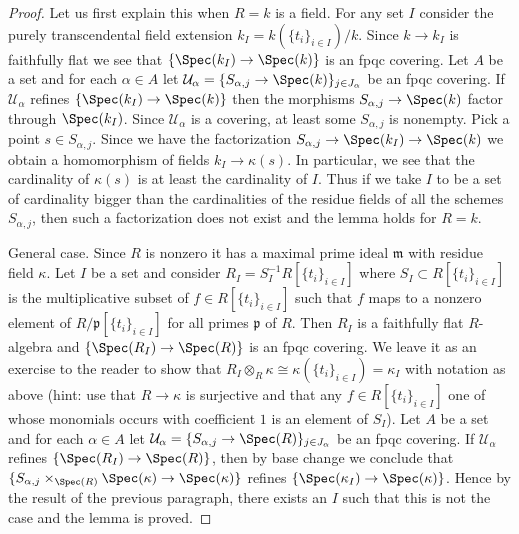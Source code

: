 \begin{proof}
Let us first explain this when $R = k$ is a field. For any set $I$ consider
the purely transcendental field extension
$k_I = k(\{t_i\}_{i \in I})/k$. Since $k \to k_I$ is faithfully flat
we see that $\{\Spec(k_I) \to \Spec(k)\}$ is an fpqc covering.
Let $A$ be a set and for each $\alpha \in A$ let
$\mathcal{U}_\alpha = \{S_{\alpha, j} \to \Spec(k)\}_{j \in J_\alpha}$ be an
fpqc covering. If $\mathcal{U}_\alpha$ refines $\{\Spec(k_I) \to \Spec(k)\}$
then the morphisms $S_{\alpha, j} \to \Spec(k)$ factor through
$\Spec(k_I)$. Since $\mathcal{U}_\alpha$ is a covering,
at least some $S_{\alpha, j}$ is nonempty. Pick a
point $s \in S_{\alpha, j}$. Since we have the factorization
$S_{\alpha, j} \to \Spec(k_I) \to \Spec(k)$
we obtain a homomorphism of fields $k_I \to \kappa(s)$.
In particular, we see that the cardinality of $\kappa(s)$
is at least the cardinality of $I$. Thus if we take $I$ to be a set
of cardinality bigger than the cardinalities of the residue fields
of all the schemes $S_{\alpha, j}$, then such a factorization does
not exist and the lemma holds for $R = k$.

\medskip\noindent
General case. Since $R$ is nonzero it has a maximal prime ideal
$\mathfrak m$ with residue field $\kappa$. Let $I$ be a set and
consider $R_I = S_I^{-1} R[\{t_i\}_{i \in I}]$
where $S_I \subset R[\{t_i\}_{i \in I}]$ is the multiplicative
subset of $f \in R[\{t_i\}_{i \in I}]$ such that $f$ maps to
a nonzero element of $R/\mathfrak p[\{t_i\}_{i \in I}]$ for
all primes $\mathfrak p$ of $R$. Then $R_I$ is a faithfully
flat $R$-algebra and $\{\Spec(R_I) \to \Spec(R)\}$ is an
fpqc covering. We leave it as an exercise to the reader to show that
$R_I \otimes_R \kappa \cong \kappa(\{t_i\}_{i \in I}) = \kappa_I$
with notation as above (hint: use that $R \to \kappa$ is surjective
and that any $f \in R[\{t_i\}_{i \in I}]$ one of whose monomials occurs
with coefficient $1$ is an element of $S_I$). Let $A$ be a set and
for each $\alpha \in A$ let
$\mathcal{U}_\alpha = \{S_{\alpha, j} \to \Spec(R)\}_{j \in J_\alpha}$ be an
fpqc covering. If $\mathcal{U}_\alpha$ refines $\{\Spec(R_I) \to \Spec(R)\}$,
then by base change we conclude that
$\{S_{\alpha, j} \times_{\Spec(R)} \Spec(\kappa) \to \Spec(\kappa)\}$
refines $\{\Spec(\kappa_I) \to \Spec(\kappa)\}$.
Hence by the result of the previous paragraph, there exists an $I$
such that this is not the case and the lemma is proved.
\end{proof}












